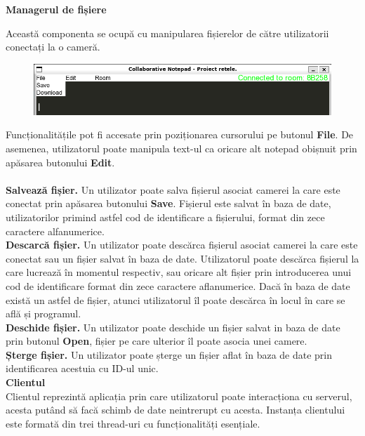 \documentclass[runningheads]{llncs}
\begin{document}
{\bf \large Managerul de fișiere}

Această componenta se ocupă cu manipularea fișierelor de către utilizatorii conectați la o cameră.

\begin{figure}[htbp!]
    \hspace{-8px} 
    \includegraphics[scale=0.6]{camera3.png}
\end{figure}

Funcționalitățile pot fi accesate prin poziționarea cursorului pe butonul {\bf File}. De asemenea, utilizatorul poate manipula text-ul ca oricare alt notepad obișnuit prin apăsarea butonului
{\bf Edit}.
\\\\

{\bf Salvează fișier.} Un utilizator poate salva fișierul asociat camerei la care este conectat prin apăsarea butonului {\bf Save}. Fișierul este salvat în baza de date, utilizatorilor primind astfel
cod de identificare a fișierului, format din zece carac\-tere alfanumerice.
\\

{\bf Descarcă fișier.} Un utilizator poate descărca fișierul asociat camerei la care este conectat sau un fișier salvat în baza de date. Utilizatorul poate descărca fișierul la care lucrează în momentul respectiv, sau oricare alt
fișier prin introducerea unui cod de identificare format din zece caractere aflanumerice. Dacă în baza de date există un astfel de fișier, atunci utilizatorul îl poate descărca în locul în care se află și programul.
\\

{\bf Deschide fișier.} Un utilizator poate deschide un fișier salvat in baza de date prin butonul {\bf Open}, fișier pe care ulterior îl poate asocia unei camere.
\\

{\bf Șterge fișier.} Un utilizator poate șterge un fișier aflat în baza de date prin identificarea acestuia cu ID-ul unic.
\\

\newpage
{\bf \large Clientul}
\\

Clientul reprezintă aplicația prin care utilizatorul poate interacționa cu serverul, acesta putând să facă schimb de date neintrerupt cu acesta.
Instanța clientului este formată din trei thread-uri cu funcționalități esențiale.
\end{document}
